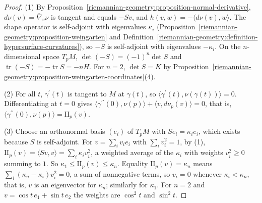 \begin{proof}
(1) By Proposition~\ref{riemannian-geometry:proposition-normal-derivative}, $d\nu(v) = \overline{\nabla}_v\nu$ is tangent and equals $-S v$, and $h(v, w) = -\langle d\nu(v), w\rangle$. The shape operator is
self-adjoint with eigenvalues $\kappa_i$ (Proposition~\ref{riemannian-geometry:proposition-weingarten} and Definition~\ref{riemannian-geometry:definition-hypersurface-curvatures}), so $-S$ is self-adjoint
with eigenvalues $-\kappa_i$. On the $n$-dimensional space $T_pM$, $\det(-S) = (-1)^n\det S$ and $\operatorname{tr}(-S) = -\operatorname{tr}S = -nH$. For $n = 2$, $\det S = K$ by
Proposition~\ref{riemannian-geometry:proposition-weingarten-coordinates}(4).

(2) For all $t$, $\gamma^{\prime}(t)$ is tangent to $M$ at $\gamma(t)$, so $\langle\gamma^{\prime}(t), \nu(\gamma(t))\rangle = 0$. Differentiating at $t = 0$ gives
$\langle\gamma^{\prime\prime}(0), \nu(p)\rangle + \langle v, d\nu_p(v)\rangle = 0$, that is, $\langle\gamma^{\prime\prime}(0), \nu(p)\rangle = \mathrm{II}_p(v)$.

(3) Choose an orthonormal basis $(e_i)$ of $T_pM$ with $S e_i = \kappa_ie_i$, which exists because $S$ is self-adjoint. For $v = \sum_iv_ie_i$ with $\sum_iv_i^2 = 1$, by (1),
$\mathrm{II}_p(v) = \langle S v, v\rangle = \sum_i\kappa_iv_i^2$, a weighted average of the $\kappa_i$ with weights $v_i^2 \geq 0$ summing to $1$. So $\kappa_1 \leq \mathrm{II}_p(v) \leq \kappa_n$. Equality
$\mathrm{II}_p(v) = \kappa_n$ means $\sum_i(\kappa_n - \kappa_i)v_i^2 = 0$, a sum of nonnegative terms, so $v_i = 0$ whenever $\kappa_i < \kappa_n$, that is, $v$ is an eigenvector for $\kappa_n$; similarly
for $\kappa_1$. For $n = 2$ and $v = \cos t\,e_1 + \sin t\,e_2$ the weights are $\cos^2t$ and $\sin^2t$.


\end{proof}
